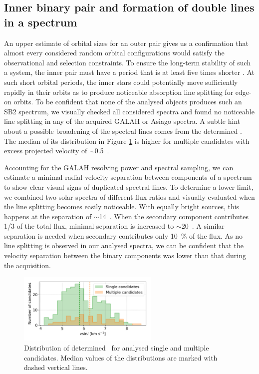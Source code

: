 \subsection{Inner binary pair and formation of double lines in a spectrum}
\label{sec:orbits_sb2}
An upper estimate of orbital sizes for an outer pair gives us a confirmation that almost every considered random orbital configurations would satisfy the observational and selection constraints. To ensure the long-term stability of such a system, the inner pair must have a period that is at least five times shorter \cite{2006epbm.book.....E}. At such short orbital periods, the inner stars could potentially move sufficiently rapidly in their orbits as to produce noticeable absorption line splitting for edge-on orbits. To be confident that none of the analysed objects produces such an SB2 spectrum, we visually checked all considered spectra and found no noticeable line splitting in any of the acquired GALAH or Asiago spectra. A subtle hint about a possible broadening of the spectral lines comes from the determined \vsin. The median of its distribution in Figure \ref{fig:vsini_hist} is higher for multiple candidates with excess projected velocity of $\sim$0.5~\kms.

Accounting for the GALAH resolving power and spectral sampling, we can estimate a minimal radial velocity separation between components of a spectrum to show clear visual signs of duplicated spectral lines. To determine a lower limit, we combined two solar spectra of different flux ratios and visually evaluated when the line splitting becomes easily noticeable. With equally bright sources, this happens at the separation of $\sim$14~\kms. When the secondary component contributes 1/3 of the total flux, minimal separation is increased to $\sim$20~\kms. A similar separation is needed when secondary contributes only 10~\% of the flux. As no line splitting is observed in our analysed spectra, we can be confident that the velocity separation between the binary components was lower than that during the acquisition.

\begin{figure}
	\centering
	\includegraphics[width=0.6\textwidth]{hist_Vsini_cannon_ebv_c3_07.png}
	\caption{Distribution of determined \vsin\ for analysed single and multiple candidates. Median values of the distributions are marked with dashed vertical lines.}
	\label{fig:vsini_hist}
\end{figure}

